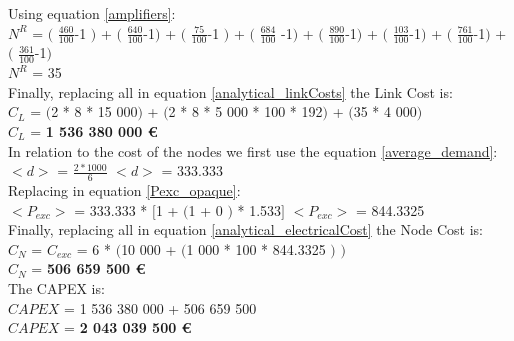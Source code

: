 Using equation \ref{amplifiers}:\\

$N^R$ = $($ $\frac{460}{100}$-1 $)$ + $($ $\frac{640}{100}$-1$)$ + $($ $\frac{75}{100}$-1 $)$ + $($ $\frac{684}{100}$ -1$)$ + $($ $\frac{890}{100}$-1$)$ + $($ $\frac{103}{100}$-1$)$ + $($ $\frac{761}{100}$-1$)$ + $($ $\frac{361}{100}$-1$)$\\

$N^R$ = 35\\

Finally, replacing all in equation \ref{analytical_linkCosts} the Link Cost is:\\

$C_L$ = $($2 * 8 * 15 000$)$ + $($2 * 8 * 5 000 * 100 * 192$)$ + $($35 * 4 000$)$\\

$C_L$ = \textbf{1 536 380 000 \euro}\\

In relation to the cost of the nodes we first use the equation \ref{average_demand}:\\

$<d>$ = $\frac{2 * 1 000}{6}$ \qquad \qquad $<d>$ = 333.333\\

Replacing in equation \ref{Pexc_opaque}:\\

$<P_{exc}>$ = 333.333 * $[$1 + $($1 + $0$ $)$ * 1.533$]$ \qquad \qquad $<P_{exc}>$ = 844.3325 \\

Finally, replacing all in equation \ref{analytical_electricalCost} the Node Cost is:\\

$C_N$ = $C_{exc}$ = 6 * $($10 000 + $($1 000 * 100 * 844.3325 $)$ $)$\\

$C_N$ = \textbf{506 659 500 \euro}\\

The CAPEX is:\\
$CAPEX$ = 1 536 380 000 + 506 659 500\\

$CAPEX$ = \textbf{2 043 039 500 \euro}\\

